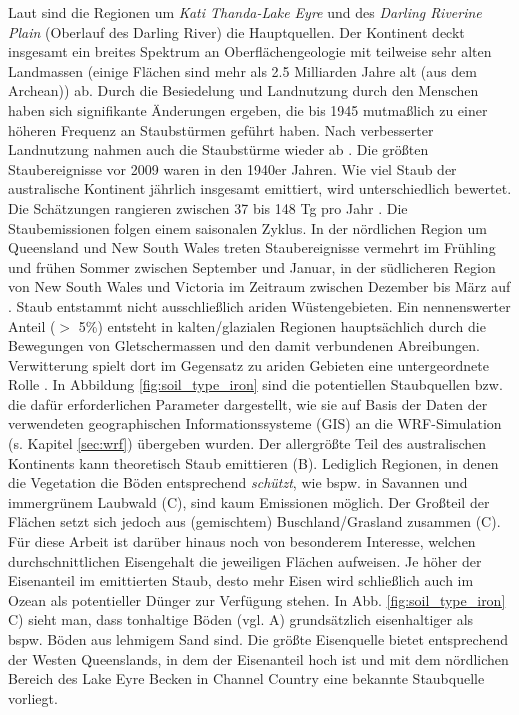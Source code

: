 \documentclass[12pt,a4paper,onecolumn]{scrartcl}
\begin{document}
Laut \citet{Deckker.2019} sind die Regionen um \textit{Kati Thanda-Lake Eyre} und des \textit{Darling Riverine Plain} (Oberlauf des Darling River) die Hauptquellen. Der Kontinent deckt insgesamt ein breites Spektrum an Oberflächengeologie mit teilweise sehr alten Landmassen (einige Flächen sind mehr als 2.5 Milliarden Jahre alt (aus dem Archean)) ab. Durch die Besiedelung und Landnutzung durch den Menschen haben sich signifikante Änderungen ergeben, die bis 1945 mutmaßlich zu einer höheren Frequenz an Staubstürmen geführt haben. Nach verbesserter Landnutzung nahmen auch die Staubstürme wieder ab \citep{Deckker.2019}. Die größten Staubereignisse vor 2009 waren in den 1940er Jahren. Wie viel Staub der australische Kontinent jährlich insgesamt emittiert, wird unterschiedlich bewertet. Die Schätzungen rangieren zwischen 37 bis 148 Tg pro Jahr \citep{Shao.2011}. Die Staubemissionen folgen einem saisonalen Zyklus. In der nördlichen Region um Queensland und New South Wales treten Staubereignisse vermehrt im Frühling und frühen Sommer zwischen September und Januar, in der südlicheren Region von New South Wales und Victoria im Zeitraum zwischen Dezember bis März auf \citep{Deckker.2019}. Staub entstammt nicht ausschließlich ariden Wüstengebieten. Ein nennenswerter Anteil ($>$ 5\%) entsteht in kalten/glazialen Regionen hauptsächlich durch die Bewegungen von Gletschermassen und den damit verbundenen Abreibungen. Verwitterung spielt dort im Gegensatz zu ariden Gebieten eine untergeordnete Rolle \citep{Marx.2018}. In Abbildung \ref{fig:soil_type_iron} sind die potentiellen Staubquellen bzw. die dafür erforderlichen Parameter dargestellt, wie sie auf Basis der Daten der verwendeten geographischen Informationssysteme (GIS) an die WRF-Simulation (s. Kapitel \ref{sec:wrf}) übergeben wurden. Der allergrößte Teil des australischen Kontinents kann theoretisch Staub emittieren (B). Lediglich Regionen, in denen die Vegetation die Böden entsprechend \textit{schützt}, wie bspw. in Savannen und immergrünem Laubwald (C), sind kaum Emissionen möglich. Der Großteil der Flächen setzt sich jedoch aus (gemischtem) Buschland/Grasland zusammen (C). Für diese Arbeit ist darüber hinaus noch von besonderem Interesse, welchen durchschnittlichen Eisengehalt die jeweiligen Flächen aufweisen. Je höher der Eisenanteil im emittierten Staub, desto mehr Eisen wird schließlich auch im Ozean als potentieller Dünger zur Verfügung stehen. In Abb. \ref{fig:soil_type_iron} C) sieht man, dass tonhaltige Böden (vgl. A) grundsätzlich eisenhaltiger als bspw. Böden aus lehmigem Sand sind. Die größte Eisenquelle bietet entsprechend der Westen Queenslands, in dem der Eisenanteil hoch ist und mit dem nördlichen Bereich des Lake Eyre Becken in Channel Country eine bekannte Staubquelle vorliegt.
\end{document}
